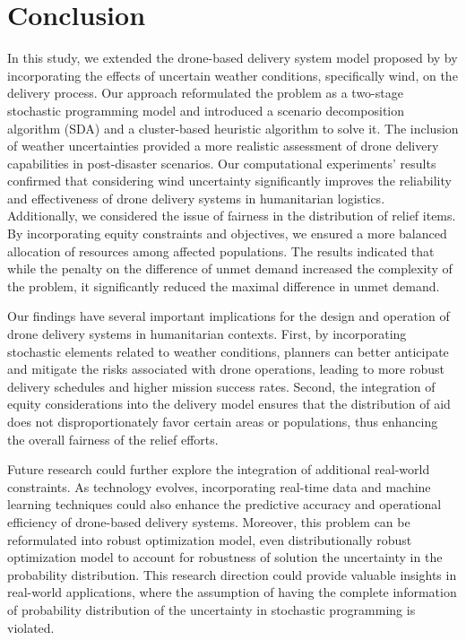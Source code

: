 \documentclass[preprint,review,11pt,authoryear]{elsarticle}
\begin{document}
\section{Conclusion}\label{sec:conclusion}
In this study, we extended the drone-based delivery system model proposed by \cite{dukkanci2023drones} by incorporating the effects of uncertain weather conditions, specifically wind, on the delivery process. Our approach reformulated the problem as a two-stage stochastic programming model and introduced a scenario decomposition algorithm (SDA) and a cluster-based heuristic algorithm to solve it. The inclusion of weather uncertainties provided a more realistic assessment of drone delivery capabilities in post-disaster scenarios. Our computational experiments' results confirmed that considering wind uncertainty significantly improves the reliability and effectiveness of drone delivery systems in humanitarian logistics. Additionally, we considered the issue of fairness in the distribution of relief items. By incorporating equity constraints and objectives, we ensured a more balanced allocation of resources among affected populations. The results indicated that while the penalty on the difference of unmet demand increased the complexity of the problem, it significantly reduced the maximal difference in unmet demand. 

Our findings have several important implications for the design and operation of drone delivery systems in humanitarian contexts. First, by incorporating stochastic elements related to weather conditions, planners can better anticipate and mitigate the risks associated with drone operations, leading to more robust delivery schedules and higher mission success rates. Second, the integration of equity considerations into the delivery model ensures that the distribution of aid does not disproportionately favor certain areas or populations, thus enhancing the overall fairness of the relief efforts.

Future research could further explore the integration of additional real-world constraints. As technology evolves, incorporating real-time data and machine learning techniques could also enhance the predictive accuracy and operational efficiency of drone-based delivery systems. Moreover, this problem can be reformulated into robust optimization model, even distributionally robust optimization model to account for robustness of solution the uncertainty in the probability distribution. This research direction could provide valuable insights in real-world applications, where the assumption of having the complete information of probability distribution of the uncertainty in stochastic programming is violated.
\end{document}
